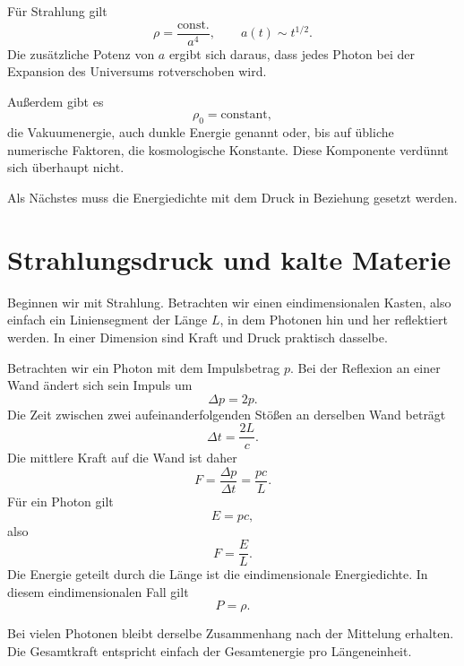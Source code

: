 Für Strahlung gilt
\begin{equation}
\rho=\frac{\text{const.}}{a^4},
\qquad
a(t)\sim t^{1/2}.
\end{equation}
Die zusätzliche Potenz von \(a\) ergibt sich daraus, dass jedes Photon bei der Expansion des Universums rotverschoben wird.

Außerdem gibt es
\begin{equation}
\rho_0=\text{constant},
\end{equation}
die Vakuumenergie, auch dunkle Energie genannt oder, bis auf übliche numerische Faktoren, die kosmologische Konstante. Diese Komponente verdünnt sich überhaupt nicht.

Als Nächstes muss die Energiedichte mit dem Druck in Beziehung gesetzt werden.

\section{Strahlungsdruck und kalte Materie}

Beginnen wir mit Strahlung. Betrachten wir einen eindimensionalen Kasten, also einfach ein Liniensegment der Länge \(L\), in dem Photonen hin und her reflektiert werden. In einer Dimension sind Kraft und Druck praktisch dasselbe.

Betrachten wir ein Photon mit dem Impulsbetrag \(p\). Bei der Reflexion an einer Wand ändert sich sein Impuls um
\begin{equation}
\Delta p = 2p.
\end{equation}
Die Zeit zwischen zwei aufeinanderfolgenden Stößen an derselben Wand beträgt
\begin{equation}
\Delta t = \frac{2L}{c}.
\end{equation}
Die mittlere Kraft auf die Wand ist daher
\begin{equation}
F=\frac{\Delta p}{\Delta t}=\frac{pc}{L}.
\end{equation}
Für ein Photon gilt
\begin{equation}
E=pc,
\end{equation}
also
\begin{equation}
F=\frac{E}{L}.
\end{equation}
Die Energie geteilt durch die Länge ist die eindimensionale Energiedichte. In diesem eindimensionalen Fall gilt
\begin{equation}
P=\rho .
\end{equation}

Bei vielen Photonen bleibt derselbe Zusammenhang nach der Mittelung erhalten. Die Gesamtkraft entspricht einfach der Gesamtenergie pro Längeneinheit.

